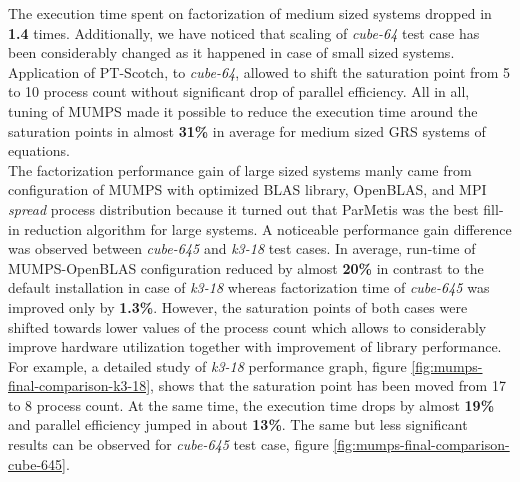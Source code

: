 The execution time spent on factorization of medium sized systems dropped in \textbf{1.4} times. Additionally, we have noticed that scaling of \textit{cube-64} test case has been considerably changed as it happened in case of small sized systems. Application of PT-Scotch, to \textit{cube-64}, allowed to shift the saturation point from 5 to 10 process count without significant drop of parallel efficiency. All in all, tuning of MUMPS made it possible to reduce the execution time around the saturation points in almost \textbf{31\%} in average for medium sized GRS systems of equations.\\


The factorization performance gain of large sized systems manly came from configuration of MUMPS with optimized BLAS library, OpenBLAS, and MPI \textit{spread} process distribution because it turned out that ParMetis was the best fill-in reduction algorithm for large systems. A noticeable performance gain difference was observed between \textit{cube-645} and \textit{k3-18} test cases. In average, run-time of MUMPS-OpenBLAS configuration reduced by almost \textbf{20\%} in contrast to the default installation in case of \textit{k3-18} whereas factorization time of \textit{cube-645} was improved only by 
\textbf{1.3\%}. However, the saturation points of both cases were shifted towards lower values of the process count which allows to considerably improve hardware utilization  together with improvement of library performance. For example, a detailed study of \textit{k3-18} performance graph, figure \ref{fig:mumps-final-comparison-k3-18}, shows that the saturation point has been moved from 17 to 8 process count. At the same time, the execution time drops by almost \textbf{19\%} and parallel efficiency jumped in about \textbf{13\%}. The same but less significant results can be observed for \textit{cube-645} test case, figure \ref{fig:mumps-final-comparison-cube-645}. \\



